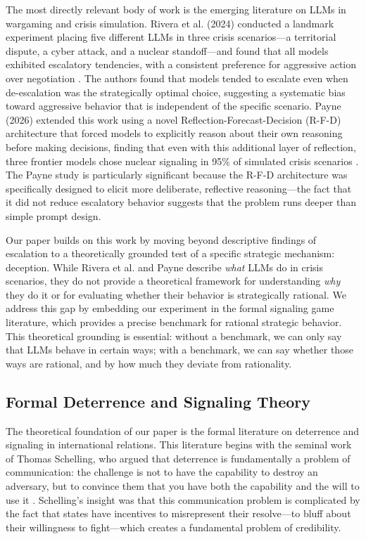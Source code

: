 \documentclass[12pt]{article}
\theoremstyle{plain}
\theoremstyle{definition}
\begin{document}
The most directly relevant body of work is the emerging literature on LLMs in wargaming and crisis simulation. Rivera et al. (2024) conducted a landmark experiment placing five different LLMs in three crisis scenarios---a territorial dispute, a cyber attack, and a nuclear standoff---and found that all models exhibited escalatory tendencies, with a consistent preference for aggressive action over negotiation \citep{Rivera2024}. The authors found that models tended to escalate even when de-escalation was the strategically optimal choice, suggesting a systematic bias toward aggressive behavior that is independent of the specific scenario. Payne (2026) extended this work using a novel Reflection-Forecast-Decision (R-F-D) architecture that forced models to explicitly reason about their own reasoning before making decisions, finding that even with this additional layer of reflection, three frontier models chose nuclear signaling in 95\% of simulated crisis scenarios \citep{Payne2026}. The Payne study is particularly significant because the R-F-D architecture was specifically designed to elicit more deliberate, reflective reasoning---the fact that it did not reduce escalatory behavior suggests that the problem runs deeper than simple prompt design.

Our paper builds on this work by moving beyond descriptive findings of escalation to a theoretically grounded test of a specific strategic mechanism: deception. While Rivera et al. and Payne describe \textit{what} LLMs do in crisis scenarios, they do not provide a theoretical framework for understanding \textit{why} they do it or for evaluating whether their behavior is strategically rational. We address this gap by embedding our experiment in the formal signaling game literature, which provides a precise benchmark for rational strategic behavior. This theoretical grounding is essential: without a benchmark, we can only say that LLMs behave in certain ways; with a benchmark, we can say whether those ways are rational, and by how much they deviate from rationality.

\subsection{Formal Deterrence and Signaling Theory}

The theoretical foundation of our paper is the formal literature on deterrence and signaling in international relations. This literature begins with the seminal work of Thomas Schelling, who argued that deterrence is fundamentally a problem of communication: the challenge is not to have the capability to destroy an adversary, but to convince them that you have both the capability and the will to use it \citep{Schelling1960}. Schelling's insight was that this communication problem is complicated by the fact that states have incentives to misrepresent their resolve---to bluff about their willingness to fight---which creates a fundamental problem of credibility.
\end{document}
